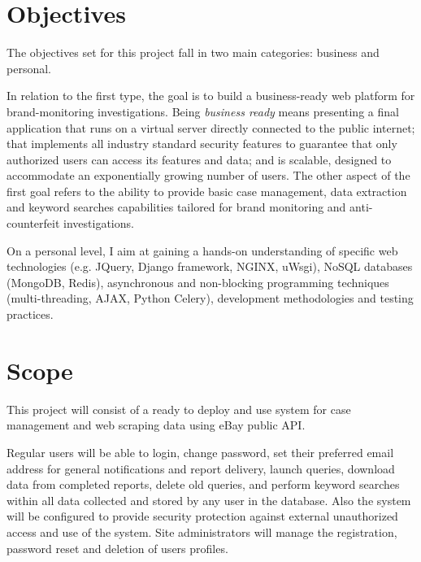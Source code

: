 \section{Objectives}
The objectives set for this project fall in two main categories: business
and personal.

In relation to the first type, the goal is to build a business-ready web
platform for brand-monitoring investigations. Being \emph{business ready}
means presenting a final application that runs on a virtual server directly
connected to the public internet; that implements all industry standard
security features to guarantee that only authorized users can access its
features and data; and is scalable, designed to accommodate an exponentially
growing number of users. The other aspect of the first goal refers to the ability to
provide basic case management, data extraction and keyword searches capabilities
tailored for brand monitoring and anti-counterfeit investigations.

On a personal level, I aim at gaining a hands-on understanding of specific web
technologies (e.g. JQuery, Django framework, NGINX, uWsgi), NoSQL databases
(MongoDB, Redis), asynchronous and non-blocking programming techniques
(multi-threading, AJAX, Python Celery), development methodologies and testing
practices.


\section{Scope}
This project will consist of a ready to deploy and use system for case
management and web scraping data using eBay public API.

Regular users will be able to login, change password, set their preferred email
address for general notifications and report delivery, launch queries, download
data from completed reports, delete old queries, and perform keyword searches
within all data collected and stored by any user in the database.
Also the system will be configured to provide security protection against external
unauthorized access and use of the system. Site administrators will manage the
registration, password reset and deletion of users profiles.


